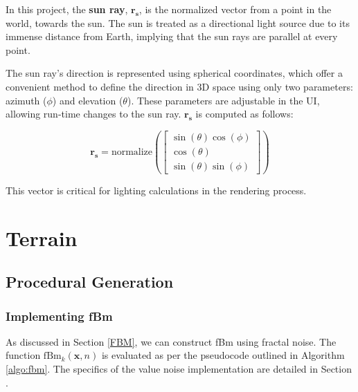 In this project, the \textbf{sun ray}, $\mathbf{r_s}$, is the normalized vector from a point in the world, towards the sun. The sun is treated as a directional light source due to its immense distance from Earth, implying that the sun rays are parallel at every point.

The sun ray's direction is represented using spherical coordinates, which offer a convenient method to define the direction in 3D space using only two parameters: azimuth ($\phi$) and elevation ($\theta$). These parameters are adjustable in the UI, allowing run-time changes to the sun ray. $\mathbf{r_s}$ is computed as follows:

\begin{equation}
    \mathbf{r_s} = \text{normalize}\left( \begin{bmatrix} \sin(\theta) \cos(\phi) \\ \cos(\theta) \\ \sin(\theta) \sin(\phi) \end{bmatrix} \right)
\end{equation}

This vector is critical for lighting calculations in the rendering process.


\section{Terrain}
\label{Terrain}

\subsection{Procedural Generation}
\label{Terrain Procedural Generation}

\subsubsection{Implementing fBm}
\label{Implement fbm}

As discussed in Section \ref{FBM}, we can construct fBm using fractal noise. The function $\text{fBm}_k(\mathbf{x}, n)$ is evaluated as per the pseudocode outlined in Algorithm \ref{algo:fbm}. The specifics of the value noise implementation are detailed in Section .

